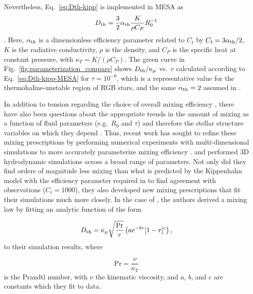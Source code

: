 Nevertheless, Eq.~\eqref{eq:Dth-kipp} is implemented in MESA as
\begin{equation} \label{eq:Dth-kipp-MESA}
    \Dth = \frac{3}{2} \alpha_{\rm{th}} \frac{K}{\rho C_P}R_0^{-1}
\end{equation}
\citep[see Eq.~(14) of][]{mesa2}. 
Here, $\alpha_{\rm{th}}$ is a dimensionless efficiency parameter related to $C_t$ by $C_t = 3\alpha_{\rm{th}}/2$, $K$ is the radiative conductivity, $\rho$ is the density, and $C_P$ is the specific heat at constant pressure, with $\kappa_T = K/(\rho C_P)$. 
The green curve in Fig.~\ref{fig:parameterization_compare} shows $D_\mathrm{th}/\kappa_\mu$ vs.~$r$ calculated according to Eq.~\eqref{eq:Dth-kipp-MESA} for $\tau = 10^{-6}$, which is a representative value for the thermohaline-unstable region of RGB stars, and the same $\alpha_{\rm{th}} = 2$ assumed in \citet{CantielloLanger2010}.

In addition to tension regarding the choice of overall mixing efficiency \citep[see e.g.][for further discussion]{Ulrich1972, kippenhahn_etal_1980, charbonnel_thermohaline_2007, CantielloLanger2010,traxler_etal_2011}, there have also been questions about the appropriate trends in the amount of mixing as a function of fluid parameters (e.g.~$R_0$ and $\tau$) and therefore the stellar structure variables on which they depend \citep{garaud_DDC_review_2018}.
Thus, recent work has sought to refine these mixing prescriptions by performing numerical experiments with multi-dimensional simulations to more accurately parameterize mixing efficiency \citep{Denissenkov2010thermohaline,traxler_etal_2011}. 
\citet{traxler_etal_2011} and \citet{brown_etal_2013} performed 3D hydrodynamic simulations across a broad range of parameters. 
Not only did they find orders of magnitude less mixing than what is predicted by the Kippenhahn model with the efficiency parameter required in \citet{charbonnel_thermohaline_2007} to find agreement with observations ($C_t = 1000$), they also developed new mixing prescriptions that fit their simulations much more closely. 
In the case of \citet{traxler_etal_2011}, the authors derived a mixing law by fitting an
analytic function 
of the form

\begin{equation} \label{eqn:trax_model}
   \Dth = \kappa_{\mu}\sqrt{\frac{\mathrm{Pr}}{\tau}}\left(a e^{-br}[1 - r]^c\right),
\end{equation}
to their simulation results,
where 

\begin{equation} \label{eq:Prandtl}
    \mathrm{Pr} = \frac{\nu}{\kappa_T}
\end{equation}
is the Prandtl number, with $\nu$ the kinematic viscosity,
%
and $a$, $b$, and $c$ are constants which they fit to data. 

